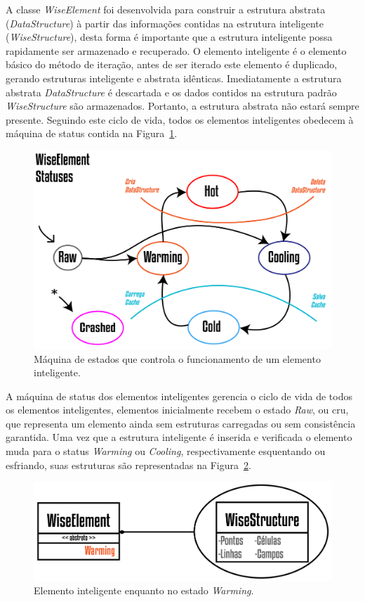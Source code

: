 \documentclass[a4paper,12pt]{monografia}
\theoremstyle{plain}
\theoremstyle{definition}
\theoremstyle{remark}
\begin{document}
A classe \textit{WiseElement} foi desenvolvida para construir a estrutura abstrata (\textit{DataStructure}) à partir das informações contidas na estrutura inteligente (\textit{WiseStructure}), desta forma é importante que a estrutura inteligente possa rapidamente ser armazenado e recuperado. O elemento inteligente é o elemento básico do método de iteração, antes de ser iterado este elemento é duplicado, gerando estruturas inteligente e abstrata idênticas. Imediatamente a estrutura abstrata \textit{DataStructure} é descartada e os dados contidos na estrutura padrão \textit{WiseStructure} são armazenados. Portanto, a estrutura abstrata não estará sempre presente. Seguindo este ciclo de vida, todos os elementos inteligentes obedecem à máquina de status contida na Figura~\ref{fig3:wiselementstatus}.

\begin{figure}[!htbp]
	\centering
	\includegraphics[scale=1.5]{Figures/WiseElementStatus@16x.png}
	\caption{Máquina de estados que controla o funcionamento de um elemento inteligente.}
	\label{fig3:wiselementstatus}
\end{figure}

A máquina de status dos elementos inteligentes gerencia o ciclo de vida de todos os elementos inteligentes, elementos inicialmente recebem o estado \textit{Raw}, ou cru, que representa um elemento ainda sem estruturas carregadas ou sem consistência garantida. Uma vez que a estrutura inteligente é inserida e verificada o elemento muda para o status \textit{Warming} ou \textit{Cooling}, respectivamente esquentando ou esfriando, suas estruturas são representadas na Figura~\ref{fig4:wiselementwarming}.

\begin{figure}[!htbp]
	\centering
	\includegraphics[scale=1.85]{Figures/WiseElementWarming@16x.png}
	\caption{Elemento inteligente enquanto no estado \textit{Warming}.}
	\label{fig4:wiselementwarming}
\end{figure}
\end{document}
